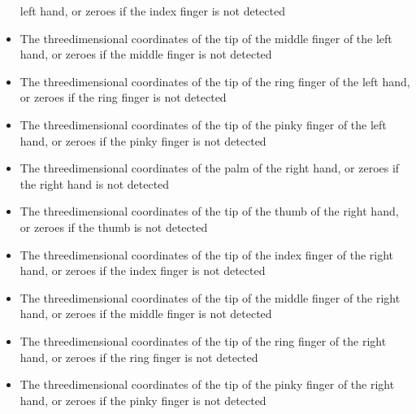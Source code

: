 \begin{itemize}
left hand, or zeroes if the index finger is not detected
\item\exSp{}The three\longDash{}dimensional coordinates of the tip of the middle finger of the
left hand, or zeroes if the middle finger is not detected
\item\exSp{}The three\longDash{}dimensional coordinates of the tip of the ring finger of the
left hand, or zeroes if the ring finger is not detected
\item\exSp{}The three\longDash{}dimensional coordinates of the tip of the pinky finger of the
left hand, or zeroes if the pinky finger is not detected
\item\exSp{}The three\longDash{}dimensional coordinates of the palm of the right hand, or
zeroes if the right hand is not detected
\item\exSp{}The three\longDash{}dimensional coordinates of the tip of the thumb of the
right hand, or zeroes if the thumb is not detected
\item\exSp{}The three\longDash{}dimensional coordinates of the tip of the index finger of the
right hand, or zeroes if the index finger is not detected
\item\exSp{}The three\longDash{}dimensional coordinates of the tip of the middle finger of the
right hand, or zeroes if the middle finger is not detected
\item\exSp{}The three\longDash{}dimensional coordinates of the tip of the ring finger of the
right hand, or zeroes if the ring finger is not detected
\item\exSp{}The three\longDash{}dimensional coordinates of the tip of the pinky finger of the
right hand, or zeroes if the pinky finger is not detected
\end{itemize}
\appendixEnd{}
